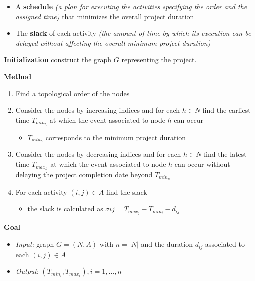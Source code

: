 \documentclass[english]{article}
\begin{document}
\begin{itemize}
  \item A \textbf{schedule} \textit{(a plan for executing the activities specifying the order and the assigned time)} that minimizes the overall project duration
  \item The \textbf{slack} of each activity \textit{(the amount of time by which its execution can be delayed without affecting the overall minimum project duration)}
\end{itemize}

\bigskip
\textbf{Initialization}
construct the graph \(G\) representing the project.

\bigskip
\textbf{Method}

\begin{enumerate}
  \item Find a topological order of the nodes
  \item Consider the nodes by increasing indices and for each \(h \in N\) find the earliest time \(T_{min_h}\) at which the event associated to node \(h\) can occur
        \begin{itemize}[label = \(\rightarrow\)]
          \item \(T_{min_h}\) corresponds to the minimum project duration
        \end{itemize}
  \item Consider the nodes by decreasing indices and for each \(h \in N\) find the latest time \(T_{max_h}\) at which the event associated to node \(h\) can occur without delaying the project completion date beyond \(T_{min_n}\)
  \item For each activity \(\left( i, j \right) \in A\) find the slack
        \begin{itemize}[label = \(\rightarrow\)]
          \item the slack is calculated as \(\sigma{ij} = T_{max_j} - T_{min_i} - d_{ij}\)
        \end{itemize}
\end{enumerate}

\bigskip
\textbf{Goal}
\begin{itemize}[label=\(\rightarrow\)]
  \item \textit{Input:} graph \(G = (N, A)\) with \(n = |N|\) and the duration \(d_{ij}\) associated to each \(\left( i, j \right) \in A\)
  \item \textit{Output}: \(\left( T_{min_i}, T_{max_i} \right), i = 1, \ldots, n\)
\end{itemize}
\end{document}
